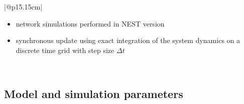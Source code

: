 \documentclass[10pt,a4paper,twoside,american]{article}
\newcommand{\note}[2][]{\added[#1]{\footnotesize\it[#2]}} %
\newcommand{\dtsim}{\Delta t}
\begin{document}
\begin{table}[ht!]
\begin{tabular}{|@{\hspace*{1mm}}p{15.15cm}|}
\\
\hline
\begin{itemize}
    \item network simulations performed in NEST version \note[id=YB]{2.20.0} \citep{nest2200}
    \item synchronous update using exact integration of the system dynamics on a discrete time grid with step size $\dtsim$ \citep{Rotter99a}
\end{itemize}
\\
\hline
\end{tabular}
\caption{Description of the network model (continued).}
\end{table}

\clearpage

\subsection{Model and simulation parameters}
\label{app:suppl_parameters}
\end{document}
